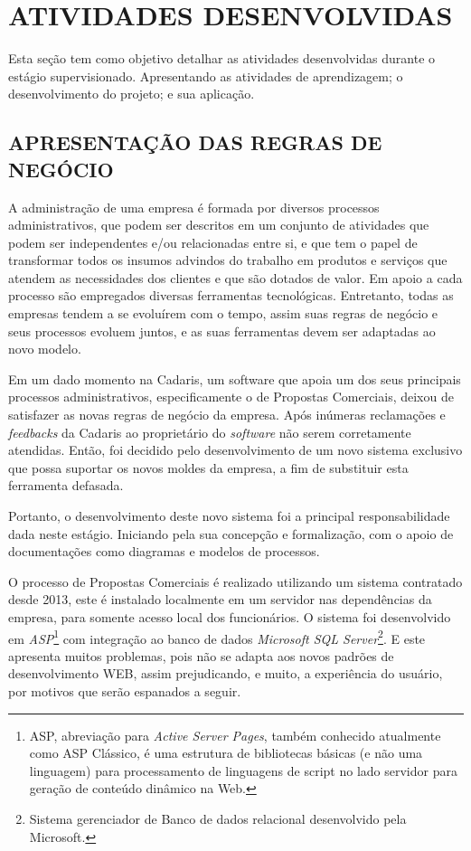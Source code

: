\documentclass[
  12pt,				%
  openany,
  oneside,
  a4paper,			%
  english,			%
  brazil
]{article}
\numberwithin{figure}{section}
\numberwithin{table}{section}
\begin{document}
\clearpage
\section{ATIVIDADES DESENVOLVIDAS}


Esta seção tem como objetivo detalhar as atividades desenvolvidas durante o estágio supervisionado. Apresentando as atividades de aprendizagem; o desenvolvimento do projeto; e sua aplicação.


\subsection{APRESENTAÇÃO DAS REGRAS DE NEGÓCIO}

A administração de uma empresa é formada por diversos processos administrativos, que podem ser descritos em um conjunto de atividades que podem ser independentes e/ou relacionadas entre si, e que tem o papel de transformar todos os insumos advindos do trabalho em produtos e serviços que atendem as necessidades dos clientes e que são dotados de valor. Em apoio a cada processo são empregados diversas ferramentas tecnológicas. Entretanto, todas as empresas tendem a se evoluírem com o tempo, assim suas regras de negócio e seus processos evoluem juntos, e as suas ferramentas devem ser adaptadas ao novo modelo. 

Em um dado momento na Cadaris, um software que apoia um dos seus principais processos administrativos, especificamente o de Propostas Comerciais, deixou de satisfazer as novas regras de negócio da empresa. Após inúmeras reclamações e \textit{feedbacks} da Cadaris ao proprietário do \textit{software} não serem corretamente atendidas. Então, foi decidido pelo desenvolvimento de um novo sistema exclusivo que possa suportar os novos moldes da empresa, a fim de substituir esta ferramenta defasada.

Portanto, o desenvolvimento deste novo sistema foi a principal responsabilidade dada neste estágio. Iniciando pela sua concepção e formalização, com o apoio de documentações como diagramas e modelos de processos.

O processo de Propostas Comerciais é realizado utilizando um sistema contratado desde 2013, este é instalado localmente em um servidor nas dependências da empresa, para somente acesso local dos funcionários. O sistema foi desenvolvido em \textit{ASP}\footnote{ASP, abreviação para \textit{Active Server Pages}, também conhecido atualmente como ASP Clássico, é uma estrutura de bibliotecas básicas (e não uma linguagem) para processamento de linguagens de script no lado servidor para geração de conteúdo dinâmico na Web.} com integração ao banco de dados \textit{Microsoft SQL Server}\footnote{Sistema gerenciador de Banco de dados relacional desenvolvido pela Microsoft.}. E este apresenta muitos problemas, pois não se adapta aos novos padrões de desenvolvimento WEB, assim prejudicando, e muito, a experiência do usuário, por motivos que serão espanados a seguir.
\end{document}
